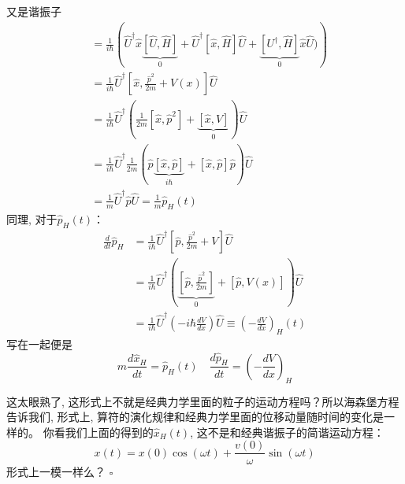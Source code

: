 \documentclass[a4paper,zihao=-4,linespread=1]{ctexrep}
\begin{document}
\begin{example}{又是谐振子}
\begin{equation}
\begin{aligned}
                &=\frac{1}{i \hbar}\left(\hat{U}^{\dagger} \hat{x}\underbrace{\left[\hat{U}, \hat{H}\right ]}_{0}+\hat{U}^{\dagger}[\hat{x}, \hat{H}] \hat{U}+\underbrace{\left[U^{\dagger}, \hat{H}\right]}_{0} \hat{x} \hat{U})\right)\\
                &=\frac{1}{i \hbar} \hat{U}^{\dagger}\left[\hat{x}, \frac{\hat{p}^{2}}{2 m}+V(x)\right] \hat{U} \\
                &=\frac{1}{i \hbar} \hat{U}^{\dagger}(\frac{1}{2 m}\left[\hat{x}, \hat{p}^{2}\right]+\underbrace{[\hat{x}, V]}_{0}) \hat{U} \\
                &=\frac{1}{i \hbar} \hat{U}^{\dagger} \frac{1}{2 m}(\hat{p} \underbrace{[\hat{x}, \hat{p}]}_{i \hbar}+[\hat{x}, \hat{p}] \hat{p}) \hat{U} \\
                &=\frac{1}{m} \hat{U}^{\dagger} \hat{p} \hat{U}=\frac{1}{m} \hat{p}_{H}(t) 
            \end{aligned}
        \end{equation}
        同理, 对于$\hat{p}_H(t)$：
        \begin{equation}
            \begin{aligned}
                \frac{d}{d t} \hat{p}_{H} &=\frac{1}{i \hbar} \hat{U}^{\dagger}\left[\hat{p}, \frac{\hat{p}^{2}}{2 m}+V\right] \hat{U} \\
                &=\frac{1}{i \hbar} \hat{U}^{\dagger}\left(\underbrace{\left[\hat{p}, \frac{\hat{p}^{2}}{2 m}\right]}_{0}+[\hat{p}, V(x)]\right) \hat{U} \\
                &=\frac{1}{i \hbar} \hat{U}^{\dagger}\left(-i \hbar \frac{d V}{d x}\right) \hat{U}\equiv \left(-\frac{d V}{d x}\right)_{H}(t)
            \end{aligned}
        \end{equation}
        写在一起便是
        \begin{equation}
            \boxed{m \frac{d \hat{x}_{H}}{d t}=\hat{p}_{H}(t) \quad \frac{d \hat{p}_{H}}{d t}=\left(-\frac{d V}{d x}\right)_{H}}
        \end{equation}

        \setlength\parindent{2em}这太眼熟了, 这形式上不就是经典力学里面的粒子的运动方程吗？所以海森堡方程告诉我们, 形式上, 算符的演化规律和经典力学里面的位移动量随时间的变化是一样的。
        你看我们上面的得到的$\hat{x}_H(t)$, 这不是和经典谐振子的简谐运动方程：
        \[x(t)=x(0)\cos(\omega t)+\frac{v(0)}{\omega}\sin (\omega t)\]
        形式上一模一样么？
        \hfill $\square$\par
    \end{example}
\end{document}
